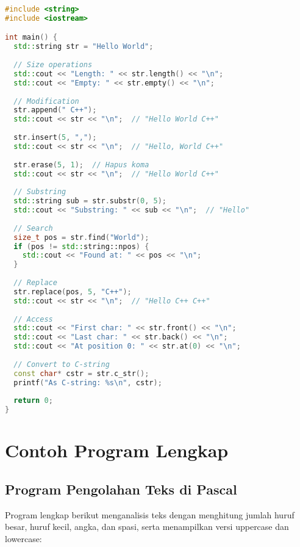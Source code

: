 \documentclass[../main.tex]{subfiles}
\begin{document}
\begin{lstlisting}[language=C++, caption={Contoh metode std::string}]
#include <string>
#include <iostream>

int main() {
  std::string str = "Hello World";
  
  // Size operations
  std::cout << "Length: " << str.length() << "\n";
  std::cout << "Empty: " << str.empty() << "\n";
  
  // Modification
  str.append(" C++");
  std::cout << str << "\n";  // "Hello World C++"
  
  str.insert(5, ",");
  std::cout << str << "\n";  // "Hello, World C++"
  
  str.erase(5, 1);  // Hapus koma
  std::cout << str << "\n";  // "Hello World C++"
  
  // Substring
  std::string sub = str.substr(0, 5);
  std::cout << "Substring: " << sub << "\n";  // "Hello"
  
  // Search
  size_t pos = str.find("World");
  if (pos != std::string::npos) {
    std::cout << "Found at: " << pos << "\n";
  }
  
  // Replace
  str.replace(pos, 5, "C++");
  std::cout << str << "\n";  // "Hello C++ C++"
  
  // Access
  std::cout << "First char: " << str.front() << "\n";
  std::cout << "Last char: " << str.back() << "\n";
  std::cout << "At position 0: " << str.at(0) << "\n";
  
  // Convert to C-string
  const char* cstr = str.c_str();
  printf("As C-string: %s\n", cstr);
  
  return 0;
}
\end{lstlisting}

\section{Contoh Program Lengkap}

\subsection{Program Pengolahan Teks di Pascal}

Program lengkap berikut menganalisis teks dengan menghitung jumlah huruf besar, huruf kecil, angka, dan spasi, serta menampilkan versi uppercase dan lowercase:
\end{document}
